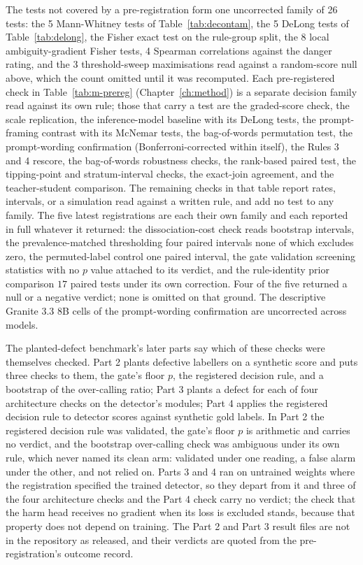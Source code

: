 The tests not covered by a pre-registration form one uncorrected family of
26 tests: the 5 Mann-Whitney tests of Table~\ref{tab:decontam}, the
5 DeLong tests of Table~\ref{tab:delong}, the Fisher exact test on the
rule-group split, the 8 local ambiguity-gradient Fisher tests, 4 Spearman
correlations against the danger rating, and the 3 threshold-sweep maximisations
read against a random-score null above, which the count omitted until it was
recomputed. Each pre-registered check in
Table~\ref{tab:m-prereg} (Chapter~\ref{ch:method}) is a separate decision family read
against its own rule; those that carry a test are the graded-score check, the scale
replication, the
inference-model baseline with its DeLong tests, the prompt-framing contrast with
its McNemar tests, the bag-of-words permutation test, the prompt-wording
confirmation (Bonferroni-corrected within itself), the Rules 3 and 4 rescore,
the bag-of-words robustness checks, the rank-based paired test, the
tipping-point and stratum-interval checks, the exact-join agreement, and the
teacher-student comparison. The remaining checks in that table report rates, intervals, or a
simulation read against a written rule, and add no test to any family. The five
latest registrations are each their own family and each reported in full whatever
it returned: the dissociation-cost check reads bootstrap intervals, the
prevalence-matched thresholding four paired intervals none of which excludes
zero, the permuted-label control one paired interval, the gate validation
screening statistics with no $p$ value attached to its verdict, and the
rule-identity prior comparison $17$ paired tests under its own correction. Four of
the five returned a null or a negative verdict; none is omitted on that ground. The descriptive Granite 3.3 8B cells of the
prompt-wording confirmation are uncorrected across models.

The planted-defect benchmark's later parts say which of these checks were themselves
checked. Part 2 plants defective labellers on a synthetic score and puts three checks to
them, the gate's floor $p$, the registered decision rule, and a bootstrap of the over-calling ratio; Part 3 plants a defect for each of four architecture checks on the detector's
modules; Part 4 applies the registered decision rule to detector scores against synthetic
gold labels. In Part 2 the registered decision rule was validated, the gate's floor $p$ is
arithmetic and carries no verdict, and the bootstrap over-calling check was ambiguous under
its own rule, which never named its clean arm: validated under one reading, a false alarm
under the other, and not relied on. Parts 3 and 4 ran on untrained weights where the
registration specified the trained detector, so they depart from it and three of the four
architecture checks and the Part 4 check carry no verdict; the check that the harm head
receives no gradient when its loss is excluded stands, because that property does not depend
on training. The Part 2 and Part 3 result files are not in the repository as released, and
their verdicts are quoted from the pre-registration's outcome record.

